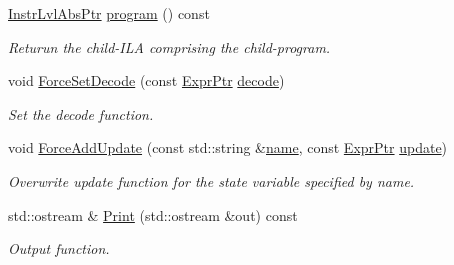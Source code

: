 \begin{DoxyCompactItemize}
\mbox{\label{classilang_1_1_instr_abdf1d7ce43fe4de27d9edf87a005e3b8}} 
\mbox{\hyperlink{classilang_1_1_instr_ab36b0ed04e0c44e66867ed1d61009f12}{Instr\+Lvl\+Abs\+Ptr}} \mbox{\hyperlink{classilang_1_1_instr_abdf1d7ce43fe4de27d9edf87a005e3b8}{program}} () const
\begin{DoxyCompactList}\small\item\em Returun the child-\/\+I\+LA comprising the child-\/program. \end{DoxyCompactList}\item 
void \mbox{\hyperlink{classilang_1_1_instr_a6874338250ece9d9a2c307ff38c732df}{Force\+Set\+Decode}} (const \mbox{\hyperlink{namespaceilang_a7c4196c72e53ea4df4b7861af7bc3bce}{Expr\+Ptr}} \mbox{\hyperlink{classilang_1_1_instr_a85ca826871a1ed004189ef24e994cfea}{decode}})
\begin{DoxyCompactList}\small\item\em Set the decode function. \end{DoxyCompactList}\item 
void \mbox{\hyperlink{classilang_1_1_instr_a051d9168bb58a1ded675f0e2bef8cee4}{Force\+Add\+Update}} (const std\+::string \&\mbox{\hyperlink{classilang_1_1_object_acf20b072e69f572910d7d80c93af0b38}{name}}, const \mbox{\hyperlink{namespaceilang_a7c4196c72e53ea4df4b7861af7bc3bce}{Expr\+Ptr}} \mbox{\hyperlink{classilang_1_1_instr_a8da933306450bb7807b57e48fc18f1c4}{update}})
\begin{DoxyCompactList}\small\item\em Overwrite update function for the state variable specified by name. \end{DoxyCompactList}\item 
\mbox{\label{classilang_1_1_instr_adf143ad8b0d0f7fcdc9af71aaa637dda}} 
std\+::ostream \& \mbox{\hyperlink{classilang_1_1_instr_adf143ad8b0d0f7fcdc9af71aaa637dda}{Print}} (std\+::ostream \&out) const
\begin{DoxyCompactList}\small\item\em Output function. \end{DoxyCompactList}\end{DoxyCompactItemize}
